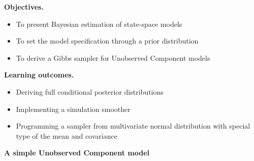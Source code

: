 \documentclass[notes,blackandwhite,mathsans,usenames,dvipsnames]{beamer}
\begin{document}
{
\begin{frame}

\bigskip\textbf{\color{mcxs1}Objectives.}
\begin{itemize}[label=$\blacktriangleright$]
\item {\color{mcxs1}To present Bayesian estimation of state-space models}
\item {\color{mcxs1}To set the model specification through a prior distribution}
\item {\color{mcxs1}To derive a Gibbs sampler for Unobserved Component models}
\end{itemize}

\bigskip\textbf{\color{mcxs2}Learning outcomes.}
\begin{itemize}[label=$\blacktriangleright$]
\item {\color{mcxs2}Deriving full conditional posterior distributions}
\item {\color{mcxs2}Implementing a simulation smoother}
\item {\color{mcxs2}Programming a sampler from multivariate normal distribution with special type of the mean and covariance}
\end{itemize}

\end{frame}
}



{
\begin{frame}

\begin{adjustwidth}{-0.5cm}{0cm}
\vspace{8.3cm}\Large
\textbf{{\color{mcxs2}A simple} {\color{mcxs1}Unobserved Component model}}
\end{adjustwidth}

\end{frame}
}
\end{document}
